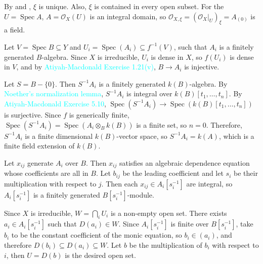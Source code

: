 \begin{exercise}\label{ex3.6}
	By  and , $\xi$ is unique. Also, $\xi$ is contained in every open subset. For the $U=\operatorname{Spec}A$, $A=\mathcal{O}_X(U)$ is an integral domain, so $\mathcal{O}_{X,\xi}=\left(\mathcal{O}_X|_U\right)_{\xi}=A_{(0)}$ is a field.
\end{exercise}

\begin{exercise}\label{ex3.7}
	Let $V=\operatorname{Spec}B\subseteq Y$ and $U_i=\operatorname{Spec}\!\left(A_i\right)\subseteq f^{-1}(V)$, such that $A_i$ is a finitely generated $B$-algebra. Since $X$ is irreducible, $U_i$ is dense in $X$, so $f\!\left(U_i\right)$ is dense in $V$, and by \textcolor{cyan}{Atiyah-Macdonald Exercise 1.21(v)}, $B\rightarrow A_i$ is injective.
	
	Let $S=B-\{0\}$. Then $S^{-1}A_i$ is a finitely generated $k(B)$-algebra. By \textcolor{cyan}{Noether's normalization lemma}, $S^{-1}A_i$ is integral over $k(B)\!\left[t_1,\dots,t_n\right]$. By \textcolor{cyan}{Atiyah-Macdonald Exercise 5.10}, $\operatorname{Spec}\!\left(S^{-1}A_i\right)\rightarrow\operatorname{Spec}\!\left(k(B)\!\left[t_1,\dots,t_n\right]\right)$ is surjective. Since $f$ is generically finite, $\operatorname{Spec}\!\left(S^{-1}A_i\right)=\operatorname{Spec}\!\left(A_i\otimes_Bk(B)\right)$ is a finite set, so $n=0$. Therefore, $S^{-1}A_i$ is a finite dimensional $k(B)$-vector space, so $S^{-1}A_i=k(A)$, which is a finite field extension of $k(B)$.
	
	Let $x_{ij}$ generate $A_i$ over $B$. Then $x_{ij}$ satisfies an algebraic dependence equation whose coefficients are all in $B$. Let $b_{ij}$ be the leading coefficient and let $s_i$ be their multiplication with respect to $j$. Then each $x_{ij}\in A_i\!\left[s_i^{-1}\right]$ are integral, so $A_i\!\left[s_i^{-1}\right]$ is a finitely generated $B\!\left[s_i^{-1}\right]$-module.
	
	Since $X$ is irreducible, $W=\bigcap_iU_i$ is a non-empty open set. There exists $a_i\in A_i\!\left[s_i^{-1}\right]$ such that $D\!\left(a_i\right)\in W$. Since $A_i\!\left[s_i^{-1}\right]$ is finite over $B\!\left[s_i^{-1}\right]$, take $b_i$ to be the constant coefficient of the monic equation, so $b_i\in\left(a_i\right)$, and therefore $D\!\left(b_i\right)\subseteq D\left(a_i\right)\subseteq W$. Let $b$ be the multiplication of $b_i$ with respect to $i$, then $U=D(b)$ is the desired open set.
\end{exercise}


